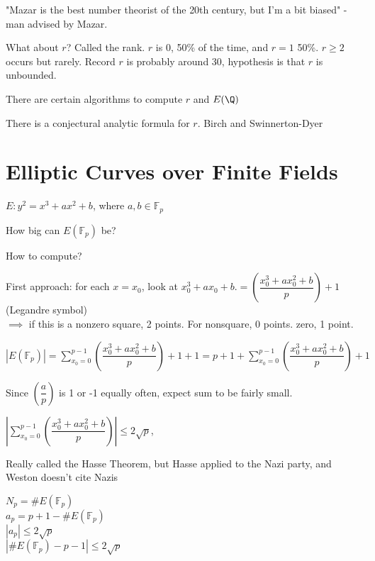 \documentclass[twoside, 10pt]{article}
\newcommand{\F}{\mathbb{F}}
\begin{document}
"Mazar is the best number theorist of the 20th century, but I'm a bit biased" - man advised by Mazar.

What about $r$? Called the rank. $r$ is 0, 50\% of the time, and $r = 1$ 50\%. $r \geq 2$ occurs but rarely. Record $r$ is probably around 30, hypothesis is that $r$ is unbounded.

There are certain algorithms to compute $r$ and $E(\Q)$

\begin{rmk}
    There is a conjectural analytic formula for $r$. Birch and Swinnerton-Dyer %
\end{rmk}


\section{Elliptic Curves over Finite Fields}
$E : y^2 = x^3 + ax^2 + b$, where $a, b \in \F_p$

How big can $E(\F_p)$ be? 

How to compute?

First approach: for each $x = x_0$, look at $x_0^3 + ax_0 + b$.$= \left(\dfrac{x_0^3 + ax_0^2 + b}{p}\right) + 1$ (Legandre symbol)\\$\implies$ if this is a nonzero square, 2 points. For nonsquare, 0 points. zero, 1 point. 

$|E(\F_p)| = \sum\limits_{x_0=0}^{p-1}\left(\dfrac{x_0^3 + ax_0^2 + b}{p}\right) + 1 + 1 = p + 1 + \sum\limits_{x_0=0}^{p-1}\left(\dfrac{x_0^3 + ax_0^2 + b}{p}\right)+ 1$ 

Since $\left(\dfrac{a}{p}\right)$ is 1 or -1 equally often, expect sum to be fairly small.
\begin{thm}
    $|\sum\limits_{x_0=0}^{p-1}\left(\dfrac{x_0^3 + ax_0^2 + b}{p}\right)| \leq 2\sqrt p$, 
\end{thm}
Really called the Hasse Theorem, but Hasse applied to the Nazi party, and Weston doesn't cite Nazis

$N_p = \#E(\F_p)$\\
$a_p = p + 1 - \#E(\F_p)$\\
$|a_p| \leq 2\sqrt{p}$\\
$|\#E(\F_p) - p - 1| \leq 2\sqrt p$
\end{document}
